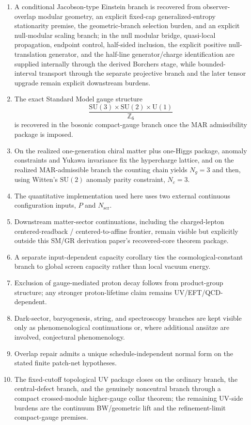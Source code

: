 \documentclass[11pt]{article}
\newcommand{\SU}{\mathrm{SU}}
\newcommand{\U}{\mathrm{U}}
\begin{document}
\begin{enumerate}[leftmargin=2em]
\item A conditional Jacobson-type Einstein branch is recovered from observer-overlap modular geometry, an explicit fixed-cap generalized-entropy stationarity premise, the geometric-branch selection burden, and an explicit null-modular scaling branch; in the null modular bridge, quasi-local propagation, endpoint control, half-sided inclusion, the explicit positive null-translation generator, and the half-line generator/charge identification are supplied internally through the derived Borchers stage, while bounded-interval transport through the separate projective branch and the later tensor upgrade remain explicit downstream burdens.
\item The exact Standard Model gauge structure
\[
\frac{\SU(3)\times\SU(2)\times\U(1)}{\mathbb Z_6}
\]
is recovered in the bosonic compact-gauge branch once the MAR admissibility package is imposed.
\item On the realized one-generation chiral matter plus one-Higgs package, anomaly constraints and Yukawa invariance fix the hypercharge lattice, and on the realized MAR-admissible branch the counting chain yields \(N_g=3\) and then, using Witten's \(\SU(2)\) anomaly parity constraint, \(N_c=3\).
\item The quantitative implementation used here uses two external continuous configuration inputs, $P$ and $N_{\mathrm{scr}}$.
\item Downstream matter-sector continuations, including the charged-lepton centered-readback / centered-to-affine frontier, remain visible but explicitly outside this SM/GR derivation paper's recovered-core theorem package.
\item A separate input-dependent capacity corollary ties the cosmological-constant branch to global screen capacity rather than local vacuum energy.
\item Exclusion of gauge-mediated proton decay follows from product-group structure; any stronger proton-lifetime claim remains UV/EFT/QCD-dependent.
\item Dark-sector, baryogenesis, string, and spectroscopy branches are kept visible only as phenomenological continuations or, where additional ans\"atze are involved, conjectural phenomenology.
\item Overlap repair admits a unique schedule-independent normal form on the stated finite patch-net hypotheses.
\item The fixed-cutoff topological UV package closes on the ordinary branch, the central-defect branch, and the genuinely noncentral branch through a compact crossed-module higher-gauge collar theorem; the remaining UV-side burdens are the continuum BW/geometric lift and the refinement-limit compact-gauge premises.
\end{enumerate}
\end{document}
